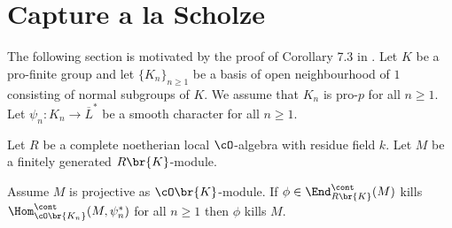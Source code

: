 \section{Capture a la Scholze}\label{sec_scholze}

The following section is motivated by the proof of Corollary 7.3 in \cite{scholze}. Let $K$ be a pro-finite group and let $\{K_n\}_{n\ge 1}$ be a basis of open neighbourhood of
$1$ consisting of normal subgroups of $K$. We assume that $K_n$ is pro-$p$ for all $n\ge 1$. Let
$\psi_n: K_n \to \overline{L}^*$ be a smooth character for all $n\ge 1$.

Let $R$ be a complete noetherian local $\cO$-algebra with residue field $k$. Let $M$ be a
finitely generated $R\br{K}$-module.

\begin{prop}\label{easy_does_it} Assume $M$ is projective as $\cO\br{K}$-module. If $\phi\in\End^{\cont}_{R\br{K}}(M)$ kills $\Hom_{\cO\br{K_n}}^{\cont}(M, \psi_n^*)$ for all $n\ge 1$ then
$\phi$ kills $M$.
\end{prop}

